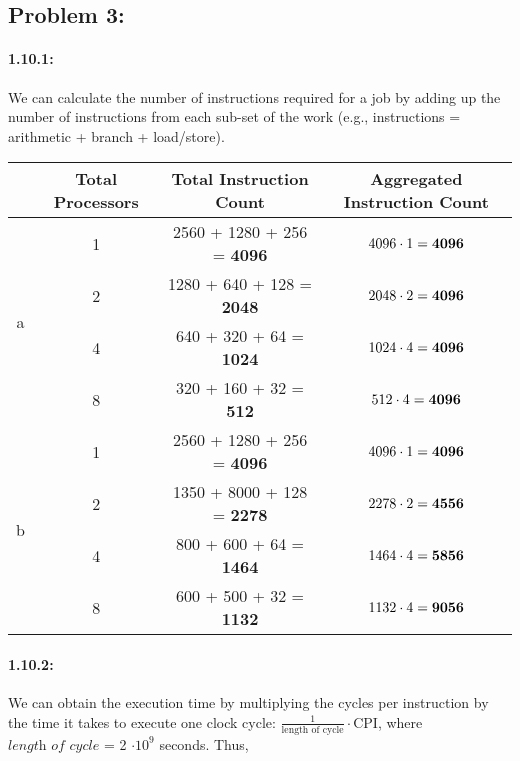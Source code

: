 \documentclass[a4paper]{article}
\begin{document}
\subsection*{Problem 3:}
\paragraph*{1.10.1:} We can calculate the number of instructions required for a job by adding up the number of instructions from each sub-set of the work (e.g., instructions = arithmetic + branch + load/store).

\begin{center}
\begin{tabular}{|c|c|c|c|c|c|}
\hline
& Total Processors & \multicolumn{2}{|c|}{Total Instruction Count} & \multicolumn{2}{|c|}{Aggregated Instruction Count}\\
\hline
\multirow{4}{*}{a} & 1 & \multicolumn{2}{|c|}{2560 + 1280 + 256 = {\bf4096}} & \multicolumn{2}{|c|}{$4096 \cdot 1 = {\bf4096}$}\\
& 2 & \multicolumn{2}{|c|}{1280 + 640 + 128 = {\bf2048}} & \multicolumn{2}{|c|}{$2048 \cdot 2 = {\bf4096}$}\\
& 4 & \multicolumn{2}{|c|}{640 + 320 + 64 = {\bf1024}} & \multicolumn{2}{|c|}{$1024 \cdot 4 = {\bf4096}$}\\
& 8 & \multicolumn{2}{|c|}{320 + 160 + 32 = {\bf512}} & \multicolumn{2}{|c|}{$512 \cdot 4 = {\bf4096}$}\\
\hline
\hline
\multirow{4}{*}{b} & 1 & \multicolumn{2}{|c|}{2560 + 1280 + 256 = {\bf4096}} & \multicolumn{2}{|c|}{$4096 \cdot 1 = {\bf4096}$}\\
& 2 & \multicolumn{2}{|c|}{1350 + 8000 + 128 = {\bf2278}} & \multicolumn{2}{|c|}{$2278 \cdot 2 = {\bf4556}$}\\
& 4 & \multicolumn{2}{|c|}{800 + 600 + 64 = {\bf1464}} & \multicolumn{2}{|c|}{$1464 \cdot 4 = {\bf5856}$}\\
& 8 & \multicolumn{2}{|c|}{600 + 500 + 32 = {\bf1132}} & \multicolumn{2}{|c|}{$1132 \cdot 4 = {\bf9056}$}\\
\hline
\end{tabular}
\end{center}

\paragraph*{1.10.2:} We can obtain the execution time by multiplying the cycles per instruction by the time it takes to execute one clock cycle: $\frac{1}{\mbox{length of cycle}} \cdot \mbox{CPI}$, where $\textit{length of cycle}$ = 2 $\cdot 10^9$ seconds. Thus, 
\end{document}
